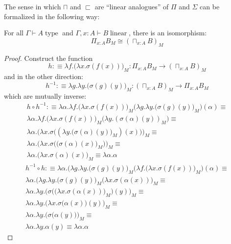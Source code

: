\documentclass[a4paper,english]{lipics-v2018}
\DeclareMathOperator{\type}{\text{ type}}
\DeclareMathOperator{\linear}{\text{ linear}}
\begin{document}
The sense in which $\sqcap$ and $\sqsubset$ are ``linear analogues'' of $\Pi$ and $\Sigma$ can be formalized in the following way:
\begin{theorem}\label{M-sqcap}
  For all $\Gamma \vdash A \type$ and $\Gamma, x : A \vdash B \linear$, there is an isomorphism:
  \[
    \Pi_{x : A}B_M \cong (\sqcap_{x : A}B)_M
  \]
  \begin{proof}
    Construct the function 
    \[
      h :\equiv \lambda f. \big ( \lambda x. \sigma(f(x))\big)_M : \Pi_{x : A}B_M \to (\sqcap_{x : A}B)_M
    \]
    and in the other direction:
    \[
      h^{-1} :\equiv \lambda g. \lambda y. \big (\sigma(g)(y)\big )_M  : (\sqcap_{x : A}B)_M \to \Pi_{x :A}B_M
    \]
    which are mutually inverse:
    \[
      \begin{split}
        h \circ h^{-1} : \equiv \lambda \alpha . \lambda f. \big (\lambda x. \sigma(f(x)) \big)_M \Big (\lambda g. \lambda y. \big (\sigma(g)(y)\big )_M  \Big ) (\alpha) \equiv \\
        \lambda \alpha . \lambda f. \big ( \lambda x. \sigma(f(x)) \big )_M \big (\lambda y. (\sigma(\alpha)(y))_M \big ) \equiv \\
        \lambda \alpha . \Big (\lambda x. \sigma \Big ((\lambda y. \big (\sigma(\alpha)(y)\big )_M)(x)\Big ) \Big )_M \equiv \\
        \lambda \alpha . \Big (\lambda x. \sigma \Big (\big (\sigma(\alpha)(x)\big )_M\Big ) \Big )_M \equiv \\
        \lambda \alpha . \Big (\lambda x. \sigma(\alpha)(x) \Big )_M \equiv
        \lambda \alpha. \alpha
      \end{split}
    \]
    \[
      \begin{split}
        h^{-1} \circ h : \equiv \lambda \alpha . (\lambda g. \lambda y. \big (\sigma(g)(y)\big )_M   \Big (\lambda f. \big (\lambda x. \sigma(f(x)) \big)_M \Big ) (\alpha) \equiv \\
       \lambda \alpha . (\lambda g. \lambda y. \big (\sigma(g)(y)\big )_M   \big (\lambda x. \sigma(\alpha(x)) \big)_M \equiv \\
       \lambda \alpha . \lambda y. \big (\sigma \Big (\big (\lambda x. \sigma(\alpha(x)) \big)_M \Big )(y)\big )_M    \equiv \\
       \lambda \alpha . \lambda y. \big ( \lambda x. \sigma \big (\alpha(x) \big)(y)\big )_M    \equiv \\
       \lambda \alpha . \lambda y. \big ( \sigma\big (\alpha(y) \big ) \big )_M    \equiv \\
       \lambda \alpha . \lambda y. \alpha(y)   \equiv \lambda \alpha. \alpha
      \end{split}
    \]
  \end{proof}
\end{theorem}
\end{document}
